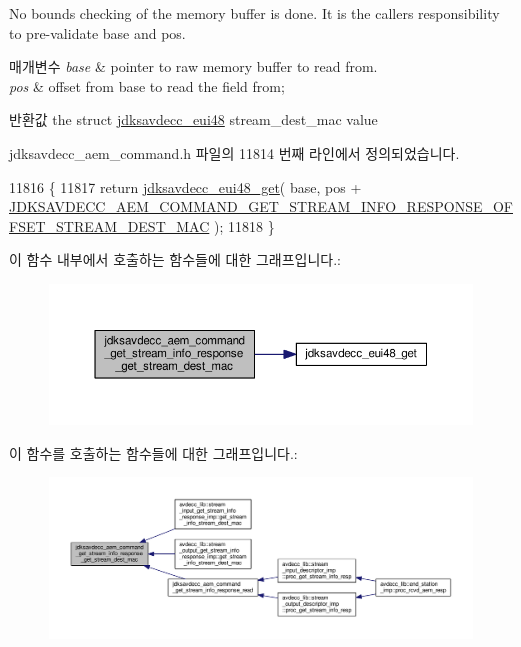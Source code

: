 No bounds checking of the memory buffer is done. It is the caller\textquotesingle{}s responsibility to pre-\/validate base and pos.


\begin{DoxyParams}{매개변수}
{\em base} & pointer to raw memory buffer to read from. \\
\hline
{\em pos} & offset from base to read the field from; \\
\hline
\end{DoxyParams}
\begin{DoxyReturn}{반환값}
the struct \hyperlink{structjdksavdecc__eui48}{jdksavdecc\+\_\+eui48} stream\+\_\+dest\+\_\+mac value 
\end{DoxyReturn}


jdksavdecc\+\_\+aem\+\_\+command.\+h 파일의 11814 번째 라인에서 정의되었습니다.


\begin{DoxyCode}
11816 \{
11817     \textcolor{keywordflow}{return} \hyperlink{group__eui48_ga7b4c95f03a90bdf416e9d0833ac08a86}{jdksavdecc\_eui48\_get}( base, pos + 
      \hyperlink{group__command__get__stream__info__response_ga528cdca96c4e91ae32e28c1af63241d6}{JDKSAVDECC\_AEM\_COMMAND\_GET\_STREAM\_INFO\_RESPONSE\_OFFSET\_STREAM\_DEST\_MAC}
       );
11818 \}
\end{DoxyCode}


이 함수 내부에서 호출하는 함수들에 대한 그래프입니다.\+:
\nopagebreak
\begin{figure}[H]
\begin{center}
\leavevmode
\includegraphics[width=350pt]{group__command__get__stream__info__response_ga7af5b92a59616d75d3eaef854b288286_cgraph}
\end{center}
\end{figure}




이 함수를 호출하는 함수들에 대한 그래프입니다.\+:
\nopagebreak
\begin{figure}[H]
\begin{center}
\leavevmode
\includegraphics[width=350pt]{group__command__get__stream__info__response_ga7af5b92a59616d75d3eaef854b288286_icgraph}
\end{center}
\end{figure}


